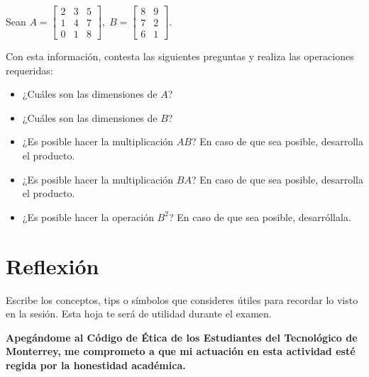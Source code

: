 \documentclass[spanish, 10pt]{article}
\begin{document}
\pagebreak

Sean $A = \begin{bmatrix}
    2 & 3 & 5 \\
    1 & 4 & 7 \\
    0 & 1 & 8
\end{bmatrix}, \;
B = \begin{bmatrix}
    8 & 9 \\
    7 & 2 \\
    6 & 1
\end{bmatrix}$.

\vspace{3ex}

Con esta información, contesta las siguientes preguntas y realiza las operaciones requeridas:

\begin{itemize}
    \item ¿Cuáles son las dimensiones de $A$?
    \item ¿Cuáles son las dimensiones de $B$?
    \item ¿Es posible hacer la multiplicación $AB$? En caso de que sea posible, desarrolla el producto.
    \item ¿Es posible hacer la multiplicación $BA$? En caso de que sea posible, desarrolla el producto.
    \item ¿Es posible hacer la operación $B^2$? En caso de que sea posible, desarróllala.
\end{itemize}

\vspace{45ex}

\section{Reflexión}

Escribe los conceptos, tips o símbolos que consideres útiles para recordar lo visto en la sesión. Esta hoja te será de utilidad durante el examen.

\vfill

\textbf{Apegándome al Código de Ética de los Estudiantes del Tecnológico de Monterrey, me comprometo a que mi actuación en esta actividad esté regida por la honestidad académica.}
\end{document}
